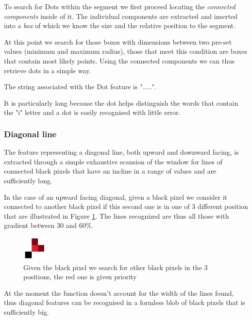 To search for Dots within the segment we first proceed locating the \emph{connected components} inside of it. The individual components are extracted and inserted into a \emph{box} of which we know the size and the relative position to the segment.


At this point we search for those boxes with dimensions between two pre-set values (minimum and maximum radius), those that meet this condition are boxes that contain most likely points.
Using the connected components we can thus retrieve dots in a simple way.

The string associated with the Dot feature is ".....".

It is particularly long because the dot helps distinguish the words that contain the "i" letter and a dot is easily recognised with little error.

\subsubsection{Diagonal line}

The feature representing a diagonal line, both upward and downward facing, is extracted through a simple exhaustive scansion of the window for lines of connected black pixels that have an incline in a range of values and are sufficiently long.

In the case of an upward facing diagonal, given a black pixel we consider it connected to another black pixel if this second one is in one of 3 different position that are illustrated in Figure \ref{pixels}. The lines recognized are thus all those with gradient between 30 and 60\%.

\begin{figure}[!htpb]
\centering
\includegraphics[width=0.12\textwidth]{images/diagP.jpg}
\caption{Given the black pixel we search for other black pixels in the 3 positions, the red one is given priority}
\label{pixels}
\end{figure} 
\vspace{3mm}
At the moment the function doesn't account for the width of the lines found, thus diagonal features can be recognised in a formless blob of black pixels that is sufficiently big. 

